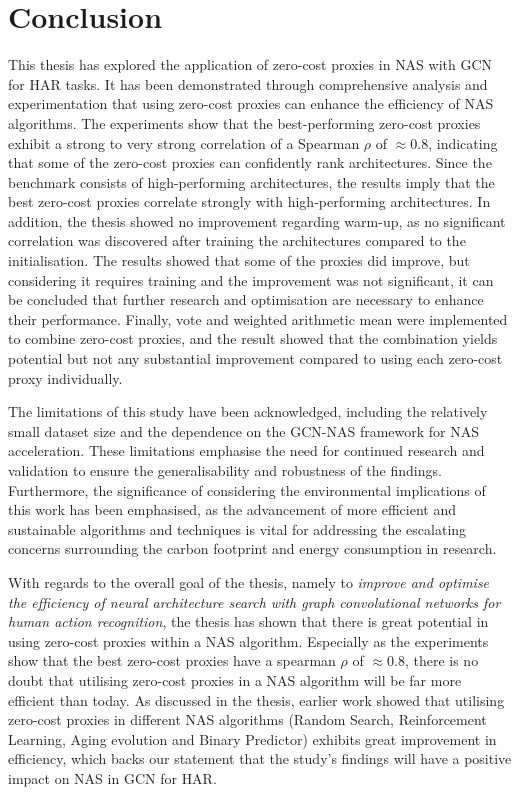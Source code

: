 \section{Conclusion}

This thesis has explored the application of zero-cost proxies in \gls{NAS} with \gls{GCN} for \gls{HAR} tasks. It has been demonstrated through comprehensive analysis and experimentation that using zero-cost proxies can enhance the efficiency of \gls{NAS} algorithms. The experiments show that the best-performing zero-cost proxies exhibit a strong to very strong correlation of a Spearman $\rho$ of $\approx 0.8$, indicating that some of the zero-cost proxies can confidently rank architectures. Since the benchmark consists of high-performing architectures, the results imply that the best zero-cost proxies correlate strongly with high-performing architectures. In addition, the thesis showed no improvement regarding warm-up, as no significant correlation was discovered after training the architectures compared to the initialisation. The results showed that some of the proxies did improve, but considering it requires training and the improvement was not significant, it can be concluded that further research and optimisation are necessary to enhance their performance. Finally, vote and weighted arithmetic mean were implemented to combine zero-cost proxies, and the result showed that the combination yields potential but not any substantial improvement compared to using each zero-cost proxy individually. 
 

The limitations of this study have been acknowledged, including the relatively small dataset size and the dependence on the \gls{GCN}-\gls{NAS} framework for \gls{NAS} acceleration. These limitations emphasise the need for continued research and validation to ensure the generalisability and robustness of the findings. Furthermore, the significance of considering the environmental implications of this work has been emphasised, as the advancement of more efficient and sustainable algorithms and techniques is vital for addressing the escalating concerns surrounding the carbon footprint and energy consumption in research.

With regards to the overall goal of the thesis, namely to \textit{improve and optimise the efficiency of neural architecture search with
graph convolutional networks for human action recognition}, the thesis has shown that there is great potential in using zero-cost proxies within a \gls{NAS} algorithm. Especially as the experiments show that the best zero-cost proxies have a spearman $\rho$ of $\approx 0.8$, there is no doubt that utilising zero-cost proxies in a \gls{NAS} algorithm will be far more efficient than today. As discussed in the thesis, earlier work showed that utilising zero-cost proxies in different \gls{NAS} algorithms (Random Search, Reinforcement Learning, Aging evolution and Binary Predictor) exhibits great improvement in efficiency, which backs our statement that the study's findings will have a positive impact on \gls{NAS} in \gls{GCN} for \gls{HAR}.